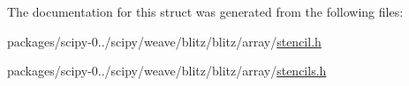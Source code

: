 The documentation for this struct was generated from the following files\+:\begin{DoxyCompactItemize}
\item 
packages/scipy-\/0../scipy/weave/blitz/blitz/array/\hyperlink{stencil_8h}{stencil.\+h}\item 
packages/scipy-\/0../scipy/weave/blitz/blitz/array/\hyperlink{stencils_8h}{stencils.\+h}\end{DoxyCompactItemize}

